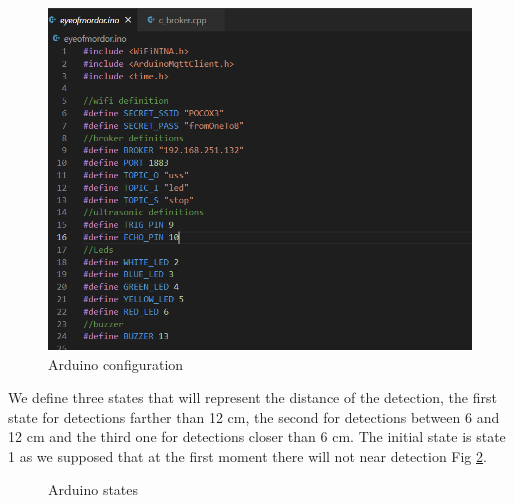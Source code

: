 \documentclass[12pt]{article}
\begin{document}
\begin{figure}[h]
\includegraphics[scale=0.665]{img/ard1.png}
\caption{Arduino configuration}
\label{fig:arduino1}
\end{figure}

We define three states that will represent the distance of the detection, the first state for detections farther than 12 cm, the second for detections between 6 and 12 cm and the third one for detections closer than 6 cm. The initial state is state 1 as we supposed that at the first moment there will not near detection Fig \ref{fig:arduino2}.

\begin{figure}[h]
\caption{Arduino states}
\label{fig:arduino2}
\end{figure}
\end{document}
